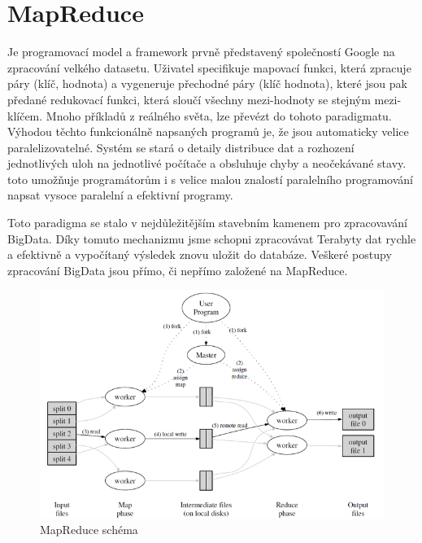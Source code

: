 \documentclass[thesis=M,czech]{FITthesis}[2012/06/26]
\begin{document}
\section{MapReduce}
Je programovací model a framework prvně představený společností Google \cite{mapreduce} na zpracování velkého datasetu. Uživatel specifikuje mapovací funkci, která zpracuje páry (klíč, hodnota) a vygeneruje přechodné páry (klíč hodnota), které jsou pak předané redukovací funkci, která sloučí všechny mezi-hodnoty se stejným mezi-klíčem. Mnoho příkladů z reálného světa, lze převézt do tohoto paradigmatu. Výhodou těchto funkcionálně napsaných programů je, že jsou automaticky velice paralelizovatelné. Systém se stará o detaily distribuce dat a rozhození jednotlivých uloh na jednotlivé počítače a obsluhuje chyby a neočekávané stavy. toto umožňuje programátorům i s velice malou znalostí paralelního programování napsat vysoce paralelní a efektivní programy. 

Toto paradigma se stalo v nejdůležitějším stavebním kamenem pro zpracovavání BigData. Díky tomuto mechanizmu jsme schopni zpracovávat Terabyty dat rychle a efektivně a vypočítaný výsledek znovu uložit do databáze. Veškeré postupy zpracování BigData jsou přímo, či nepřímo založené na MapReduce. 

\begin{figure}[!h]
\includegraphics[scale=0.6]{images/mapreduce}
\caption{MapReduce schéma \cite{mapreduce}}
\label{fig:mapreduce}
\end{figure}

\newpage
\end{document}
